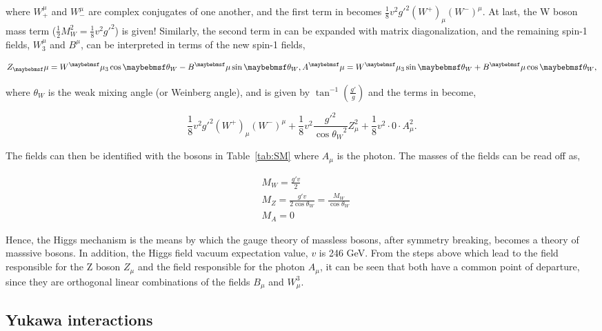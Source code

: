 where $W^\mu_{+}$ and $W^\mu_{-}$ are complex conjugates of one another, and the first term in  becomes $\frac{1}{8}v^2g'^{2}(W^+)_\mu(W^-)^\mu$. At last, the W boson mass term ($\frac{1}{2}M_{W}^2 = \frac{1}{8}v^2g'^{2}$) is given! Similarly, the second term in  can be expanded with matrix diagonalization, and the remaining spin-1 fields, $W^\mu_3$ and $B^\mu$, can be interpreted in terms of the new spin-1 fields, 

\begin{equation}
  Z_\mu = W^\mu_3\cos{\theta_W} - B^\mu\sin{\theta_W}, \\
  A^\mu = W^\mu_3\sin{\theta_W} + B^\mu\cos{\theta_W},
\end{equation} 

where $\theta_W$ is the weak mixing angle (or Weinberg angle), and is given by $\tan^{-1}(\frac{g'}{g})$ and the terms in  become,

\begin{equation}
  \frac{1}{8}v^2g'^{2}(W^+)_\mu(W^-)^\mu + \frac{1}{8}v^2\frac{g'^{2}}{\cos{\theta_W}^2}Z_\mu^2 + \frac{1}{8}v^2\cdot0\cdot A_\mu^2.
  \label{eq:EWmass}
\end{equation}

The fields can then be identified with the bosons in Table~\ref{tab:SM} where $A_\mu$ is the photon. The masses of the fields can be read off as,

\begin{equation}
  \begin{split}
    & M_W = \frac{g'v}{2} \\ 
    & M_Z = \frac{g'v}{2\cos{\theta_W}} = \frac{M_W}{\cos{\theta_W}} \\ 
    & M_A = 0 
  \end{split}
\end{equation}

Hence, the Higgs mechanism is the means by which the gauge theory of massless bosons, after symmetry breaking, becomes a theory of masssive bosons. In addition, the Higgs field vacuum expectation value, $v$ is 246 GeV. From the steps above which lead to the field responsible for the Z boson $Z_\mu$ and the field responsible for the photon $A_\mu$, it can be seen that both have a common point of departure, since they are orthogonal linear combinations of the fields $B_\mu$ and $W_\mu^3$. 

\subsection{Yukawa interactions}
\label{subsec:yukawa}

